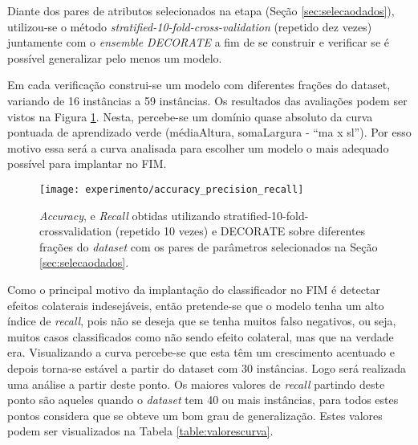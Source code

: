 Diante dos pares de atributos selecionados na etapa (Seção \ref{sec:selecaodados}), utilizou-se o método \textit{stratified-10-fold-cross-validation} (repetido dez vezes) juntamente com o \textit{ensemble DECORATE} a fim de se construir e verificar se é possível generalizar pelo menos um modelo.

Em cada verificação construi-se um modelo com diferentes frações do dataset, variando de 16 instâncias a 59 instâncias. Os resultados das avaliações podem ser vistos na Figura \ref{fig:accuracy_precision_recall}. Nesta, percebe-se um domínio quase absoluto da curva pontuada de aprendizado verde (médiaAltura, somaLargura - ``ma x sl''). Por esso motivo essa será a curva analisada para escolher um modelo o mais adequado possível para implantar no FIM.

\begin{figure}[!h] \centering 
  \centering
  \texttt{[image: experimento/accuracy\_precision\_recall]} 
  \caption{\textit{Accuracy},  e \textit{Recall} obtidas utilizando stratified-10-fold-crossvalidation (repetido 10 vezes) e DECORATE sobre diferentes frações do \textit{dataset} com os pares de parâmetros  selecionados na Seção \ref{sec:selecaodados}.} 
  \label{fig:accuracy_precision_recall}
\end{figure}

Como o principal motivo da implantação do classificador no FIM é detectar efeitos colaterais indesejáveis, então pretende-se que o modelo tenha um alto índice de \textit{recall}, pois não se deseja que se tenha muitos falso negativos, ou seja, muitos casos classificados como não sendo efeito colateral, mas que na verdade era. Visualizando a curva percebe-se que esta têm um crescimento acentuado e depois torna-se estável a partir do dataset com 30 instâncias. Logo será realizada uma análise a partir deste ponto. Os maiores valores de \textit{recall} partindo deste ponto são aqueles quando o \textit{dataset} tem 40 ou mais instâncias, para todos estes pontos considera que se obteve um bom grau de generalização. Estes valores podem ser visualizados na Tabela \ref{table:valorescurva}. 

